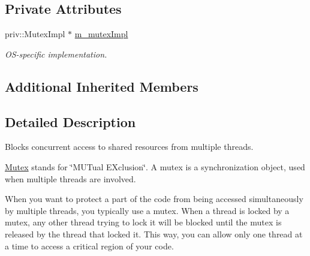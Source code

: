 \subsection*{Private Attributes}
\begin{DoxyCompactItemize}
\item 
\mbox{\label{classsf_1_1_mutex_a057421e9a5f12ea7b9996bd6742d022e}} 
priv\+::\+Mutex\+Impl $\ast$ \mbox{\hyperlink{classsf_1_1_mutex_a057421e9a5f12ea7b9996bd6742d022e}{m\+\_\+mutex\+Impl}}
\begin{DoxyCompactList}\small\item\em O\+S-\/specific implementation. \end{DoxyCompactList}\end{DoxyCompactItemize}
\subsection*{Additional Inherited Members}


\subsection{Detailed Description}
Blocks concurrent access to shared resources from multiple threads. 

\begin{DoxyVerb}\end{DoxyVerb}


\mbox{\hyperlink{classsf_1_1_mutex}{Mutex}} stands for \char`\"{}\+M\+U\+Tual E\+Xclusion\char`\"{}. A mutex is a synchronization object, used when multiple threads are involved.

When you want to protect a part of the code from being accessed simultaneously by multiple threads, you typically use a mutex. When a thread is locked by a mutex, any other thread trying to lock it will be blocked until the mutex is released by the thread that locked it. This way, you can allow only one thread at a time to access a critical region of your code.

